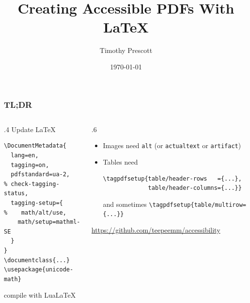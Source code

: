 \documentclass{ltx-talk}
\title[Accessible PDFs]{Creating Accessible PDFs With \LaTeX}
\author[Tim Prescott]{Timothy Prescott}
\institute{University of North Dakota}
\date{\today}
\begin{document}
\begin{frame}
\maketitle[
  element-order = {title, author, titlegraphic, date},
  framestyle = plain
]
\end{frame}

\begin{frame*}
\frametitle{TL;DR}
\begin{columns}
\begin{column}{.4\textwidth}
Update \LaTeX
\begin{lstlisting}
\DocumentMetadata{
  lang=en,
  tagging=on,
  pdfstandard=ua-2,
% check-tagging-status,
  tagging-setup={
%    math/alt/use,
    math/setup=mathml-SE
  }
}
\documentclass{...}
\usepackage{unicode-math}
\end{lstlisting}
compile with Lua\LaTeX
\end{column}
\begin{column}{.6\textwidth}
\begin{itemize}
\item Images need \texttt{alt} (or \texttt{actualtext} or \texttt{artifact})
\item Tables need
\begin{lstlisting}
\tagpdfsetup{table/header-rows   ={...},
             table/header-columns={...}}
\end{lstlisting}
and sometimes \texttt{\small\textbackslash tagpdfsetup\{table/multirow=\{...\}\}}
\end{itemize}
\begin{center}
\url{https://github.com/teepeemm/accessibility}\\\bigskip
{}
\end{center}
\end{column}
\end{columns}
\end{frame*}
\end{document}
